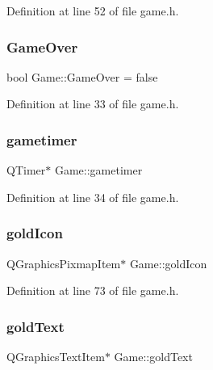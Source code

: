 Definition at line 52 of file game.\+h.

\mbox{\label{class_game_ad08e48fb0fbd89fe67ccb42ff8e8fff1}} 
\subsubsection{\texorpdfstring{Game\+Over}{GameOver}}
{\footnotesize\ttfamily bool Game\+::\+Game\+Over = false}



Definition at line 33 of file game.\+h.

\mbox{\label{class_game_a8feee9081542b15a9f2d889a6f1c8257}} 
\subsubsection{\texorpdfstring{gametimer}{gametimer}}
{\footnotesize\ttfamily Q\+Timer$\ast$ Game\+::gametimer}



Definition at line 34 of file game.\+h.

\mbox{\label{class_game_a1ac5cae6ba58ec5fe157b138d6c41eac}} 
\subsubsection{\texorpdfstring{gold\+Icon}{goldIcon}}
{\footnotesize\ttfamily Q\+Graphics\+Pixmap\+Item$\ast$ Game\+::gold\+Icon}



Definition at line 73 of file game.\+h.

\mbox{\label{class_game_a744c42428dc6293af83752027f9cbfde}} 
\subsubsection{\texorpdfstring{gold\+Text}{goldText}}
{\footnotesize\ttfamily Q\+Graphics\+Text\+Item$\ast$ Game\+::gold\+Text}



